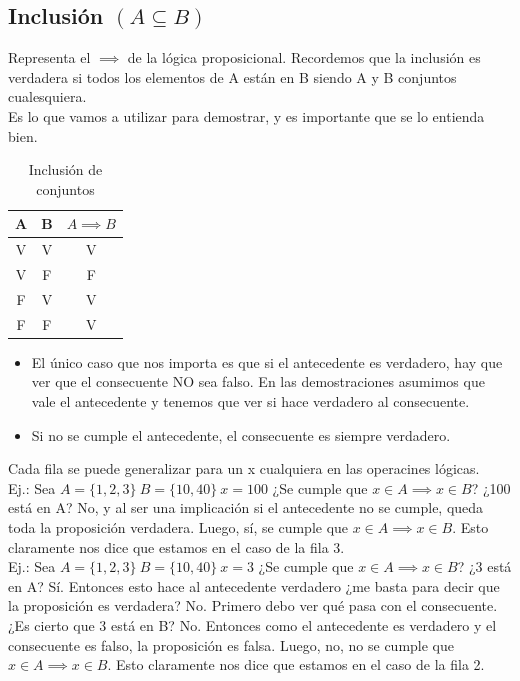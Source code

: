 \documentclass[10pt,a4paper]{article}
\begin{document}
\subsection*{Inclusión $(A \subseteq B)$}
Representa el $\implies$ de la lógica proposicional. Recordemos que la inclusión es verdadera si todos los elementos de A están en B siendo A y B conjuntos cualesquiera. \\
Es lo que vamos a utilizar para demostrar, y es importante que se lo entienda bien. 
\begin{table}[h!]
    \centering
    \begin{tabular}{|c | c | c|}
    \hline
    \textbf{A} & \textbf{B} & \textbf{$A \implies B$} \\[0.1cm]
    \hline
    V & V & V \\
    V & F & F \\
    F & V & V \\
    F & F & V \\
    \hline
    \end{tabular}
    \caption{Inclusión de conjuntos}
\end{table} 
\begin{itemize}
    \item El único caso que nos importa es que si el antecedente es verdadero, hay que ver que el consecuente NO sea falso. En las demostraciones asumimos que vale el antecedente y tenemos que ver si hace verdadero al consecuente.
    \item Si no se cumple el antecedente, el consecuente es siempre verdadero.
\end{itemize}
Cada fila se puede generalizar para un x cualquiera en las operacines lógicas. \\
Ej.: Sea $A = \{1, 2, 3\} \ B = \{10, 40\} \ x = 100$ ¿Se cumple que $ x \in A \implies x \in B$? ¿100 está en A? No, y al ser una implicación si el antecedente no se cumple, queda toda la proposición verdadera. Luego, sí, se cumple que $ x \in A \implies x \in B$. Esto claramente nos dice que estamos en el caso de la fila 3. \\ 
Ej.: Sea $A = \{1, 2, 3\} \ B = \{10, 40\} \ x = 3$ ¿Se cumple que $ x \in A \implies x \in B$? ¿3 está en A? Sí. Entonces esto hace al antecedente verdadero ¿me basta para decir que la proposición es verdadera? No. Primero debo ver qué pasa con el consecuente. ¿Es cierto que 3 está en B? No. Entonces como el antecedente es verdadero y el consecuente es falso, la proposición es falsa. Luego, no, no se cumple que $ x \in A \implies x \in B$. Esto claramente nos dice que estamos en el caso de la fila 2. \\
\end{document}
